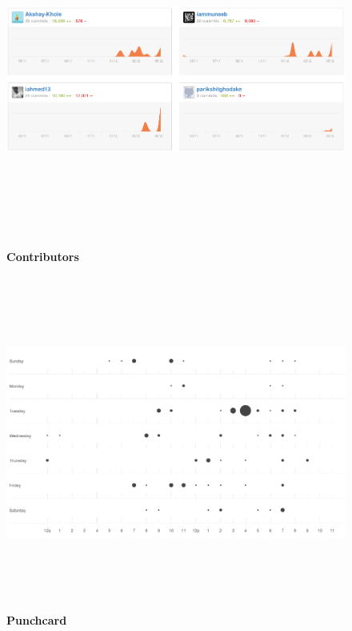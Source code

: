 \newpage
\begin{figure}[H]
  \centering
    \includegraphics[height= 11cm, width=17cm]{project/images/GitHub/contributors}
  \caption{\textbf{Contributors}}
\end{figure}
\vspace{1cm}
\begin{figure}[H]
  \centering
    \includegraphics[height= 11cm, width=17cm]{project/images/GitHub/punchcard}
  \caption{\textbf{Punchcard}}
\end{figure}
\newpage
